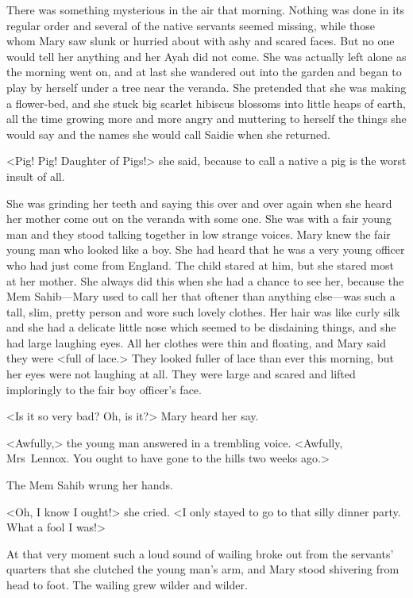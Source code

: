 There was something mysterious in the air that morning. Nothing was done in its regular order and several of the native servants seemed missing, while those whom Mary saw slunk or hurried about with ashy and scared faces. But no one would tell her anything and her Ayah did not come. She was actually left alone as the morning went on, and at last she wandered out into the garden and began to play by herself under a tree near the veranda. She pretended that she was making a flower-bed, and she stuck big scarlet hibiscus blossoms into little heaps of earth, all the time growing more and more angry and muttering to herself the things she would say and the names she would call Saidie when she returned.

<Pig! Pig! Daughter of Pigs!> she said, because to call a native a pig is the worst insult of all.

She was grinding her teeth and saying this over and over again when she heard her mother come out on the veranda with some one. She was with a fair young man and they stood talking together in low strange voices. Mary knew the fair young man who looked like a boy. She had heard that he was a very young officer who had just come from England. The child stared at him, but she stared most at her mother. She always did this when she had a chance to see her, because the Mem Sahib—Mary used to call her that oftener than anything else—was such a tall, slim, pretty person and wore such lovely clothes. Her hair was like curly silk and she had a delicate little nose which seemed to be disdaining things, and she had large laughing eyes. All her clothes were thin and floating, and Mary said they were <full of lace.> They looked fuller of lace than ever this morning, but her eyes were not laughing at all. They were large and scared and lifted imploringly to the fair boy officer's face.

<Is it so very bad? Oh, is it?> Mary heard her say.

<Awfully,> the young man answered in a trembling voice. <Awfully, Mrs~Lennox. You ought to have gone to the hills two weeks ago.>

The Mem Sahib wrung her hands.

<Oh, I know I ought!> she cried. <I only stayed to go to that silly dinner party. What a fool I was!>

At that very moment such a loud sound of wailing broke out from the servants' quarters that she clutched the young man's arm, and Mary stood shivering from head to foot. The wailing grew wilder and wilder.

